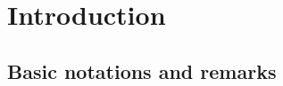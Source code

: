 \documentclass[a4paper,oneside,11pt,bibliography=totoc]{scrartcl}
\theoremstyle{plain}
\theoremstyle{remark}
\theoremstyle{definition}
\begin{document}
\tableofcontents





\renewcommand{\thefootnote}{\arabic{footnote}}
%
\setlength{\parindent}{12 pt}




\section{Introduction}

\subsection{Basic notations and remarks}\label{BasicNotations}
\end{document}
